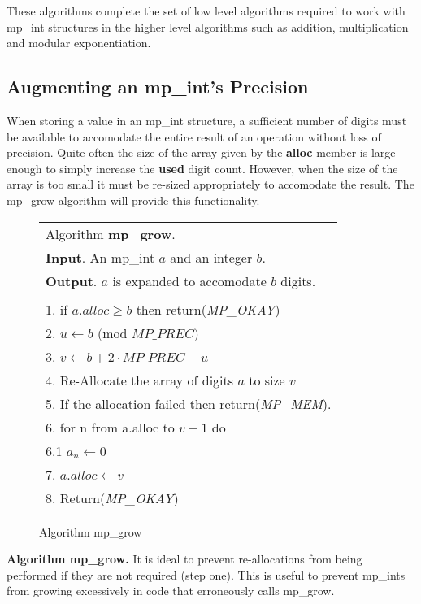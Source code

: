\documentclass[b5paper]{book}
\begin{document}
These algorithms complete the set of low level algorithms required to work with mp\_int structures in the higher level
algorithms such as addition, multiplication and modular exponentiation.

\subsection{Augmenting an mp\_int's Precision}
When storing a value in an mp\_int structure, a sufficient number of digits must be available to accomodate the entire 
result of an operation without loss of precision.  Quite often the size of the array given by the \textbf{alloc} member 
is large enough to simply increase the \textbf{used} digit count.  However, when the size of the array is too small it 
must be re-sized appropriately to accomodate the result.  The mp\_grow algorithm will provide this functionality.

\newpage\begin{figure}[here]
\begin{center}
\begin{tabular}{l}
\hline Algorithm \textbf{mp\_grow}. \\
\textbf{Input}.   An mp\_int $a$ and an integer $b$. \\
\textbf{Output}.  $a$ is expanded to accomodate $b$ digits. \\
\hline \\
1.  if $a.alloc \ge b$ then return(\textit{MP\_OKAY}) \\
2.  $u \leftarrow b\mbox{ (mod }MP\_PREC\mbox{)}$ \\
3.  $v \leftarrow b + 2 \cdot MP\_PREC - u$ \\
4.  Re-Allocate the array of digits $a$ to size $v$ \\
5.  If the allocation failed then return(\textit{MP\_MEM}). \\
6.  for n from a.alloc to $v - 1$ do  \\
\hspace{+3mm}6.1  $a_n \leftarrow 0$ \\
7.  $a.alloc \leftarrow v$ \\
8.  Return(\textit{MP\_OKAY}) \\
\hline
\end{tabular}
\end{center}
\caption{Algorithm mp\_grow}
\end{figure}

\textbf{Algorithm mp\_grow.}
It is ideal to prevent re-allocations from being performed if they are not required (step one).  This is useful to 
prevent mp\_ints from growing excessively in code that erroneously calls mp\_grow.  
\end{document}
